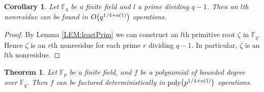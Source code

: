 \documentclass{article}
\let\originalleft\left
\let\originalright\right
\renewcommand{\left}{\mathopen{}\mathclose\bgroup\originalleft}
\renewcommand{\right}{\aftergroup\egroup\originalright}
\newcounter{dummy} \numberwithin{dummy}{section}
\theoremstyle{plain}
\newtheorem{thm}[dummy]{Theorem}
\newtheorem{cor}[dummy]{Corollary}
\theoremstyle{definition}
\def\Fp {{ \mathbb{F} _ {p} }}
\def\Fq {{ \mathbb{F} _ {q} }}
\def\poly {{ \mathrm{poly} }}
\begin{document}
		\begin{cor}
    \label{LEM:leastNonres}
		    Let $\Fq$ be a finite field and $l$ a prime dividing $q-1$. Then an $l$th nonresidue can be found in $O \left( q^{{1/4}+o(1)} \right)$ operations.
		\end{cor}
		
		\begin{proof}
		    By Lemma \ref{LEM:leastPrim} we can construct an $l$th primitive root $\zeta$ in $\Fq$. Hence $\zeta$ is an $r$th nonresidue for each prime $r$ dividing $q-1$. In particular, $\zeta$ is an $l$th nonresidue.
		\end{proof}
		
		\begin{thm}
		\label{THM:boundedDeg}
		    Let $\Fp$ be a finite field, and $f$ be a polynomial of bounded degree over $\Fq$. Then $f$ can be factored deterministically in $\poly \left(  p^{1/4+o(1)} \right) $ operations. 
		\end{thm}
		
\end{document}
